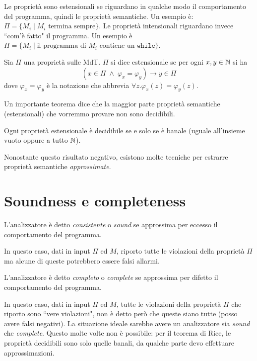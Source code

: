 Le proprietà sono estensionali se riguardano in qualche modo il comportamento del programma, quindi le proprietà semantiche. Un esempio è: $\Pi = \{ M_i \mid M_i \text{ termina sempre} \}$. Le proprietà intensionali riguardano invece ``com'è fatto" il programma. Un esempio è $\Pi = \{ M_i \mid \text{il programma di } M_i \text{ contiene un } \texttt{while} \}$.

\begin{definition}
Sia $\Pi$ una proprietà sulle MdT. $\Pi$ si dice estensionale se per ogni $x,y\in\mathbb{N}$ si ha
\[ \left( x \in \Pi \; \land \; \varphi_x = \varphi_y \right) \to y \in \Pi \]
dove $\varphi_x = \varphi_y$ è la notazione che abbrevia $\forall z . \varphi_x(z)= \varphi_y(z)$.
\end{definition}

Un importante teorema dice che la maggior parte proprietà semantiche (estensionali) che vorremmo provare non sono decidibili.

\begin{theorem}
Ogni proprietà estensionale è decidibile se e solo se è banale (uguale all'insieme vuoto oppure a tutto $\mathbb{N}$).
\end{theorem}

Nonostante questo risultato negativo, esistono molte tecniche per estrarre proprietà semantiche \emph{approssimate}.

\section{Soundness e completeness}

\begin{definition}[Soundness]
L'analizzatore è detto \emph{consistente} o \emph{sound} se approssima per eccesso il comportamento del programma.
\end{definition}
In questo caso, dati in input $\Pi$ ed $M$, riporto tutte le violazioni della proprietà $\Pi$ ma alcune di queste potrebbero essere falsi allarmi.

\begin{definition}[Completeness]
L'analizzatore è detto \emph{completo} o \emph{complete} se approssima per difetto il comportamento del programma.
\end{definition}
In questo caso, dati in input $\Pi$ ed $M$, tutte le violazioni della proprietà $\Pi$ che riporto sono ``vere violazioni", non è detto però che queste siano tutte (posso avere falsi negativi). La situazione ideale sarebbe avere un analizzatore sia \emph{sound} che \emph{complete}. Questo molte volte non è possibile: per il teorema di Rice, le proprietà decidibili sono solo quelle banali, da qualche parte devo effettuare approssimazioni.

